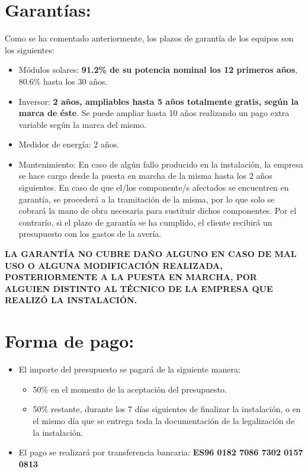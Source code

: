 \documentclass[fontsize=11pt, Myfinal=true, oneside, numbers=noenddot]{report}
\begin{document}
\section*{Garantías:}
Como se ha comentado anteriormente, los plazos de garantía de los equipos son los siguientes:
\begin{itemize}
\item Módulos solares: \textbf{91.2\% de su potencia nominal los 12 primeros años}, 80.6\% hasta los 30 años.
\item Inversor: \textbf{2 años, ampliables hasta 5 años totalmente gratis, según la marca de éste}. Se puede ampliar hasta 10 años realizando un pago extra variable según la marca del mismo.
\item Medidor de energía: 2 años.
\item Mantenimiento: En caso de algún fallo producido en la instalación, la empresa se hace cargo desde la puesta en marcha de la misma hasta los 2 años siguientes. En caso de que el/los componente/s afectados se encuentren en garantía, se procederá a la tramitación de la misma, por lo que solo se cobrará la mano de obra necesaria para sustituir dichos componentes. Por el contrarío, si el plazo de garantía se ha cumplido, el cliente recibirá un presupuesto con los gastos de la avería.           
\end{itemize}
\textbf{LA GARANTÍA NO CUBRE DAÑO ALGUNO EN CASO DE MAL USO O ALGUNA MODIFICACIÓN REALIZADA, POSTERIORMENTE A LA PUESTA EN MARCHA, POR ALGUIEN DISTINTO AL TÉCNICO DE LA EMPRESA QUE REALIZÓ LA INSTALACIÓN. }

\section*{Forma de pago:}
				 
\begin{itemize}
\item El importe del presupuesto se pagará de la siguiente manera:
\begin{itemize}
\item 50\% en el momento de la aceptación del presupuesto.
\item 50\% restante, durante los 7 días siguientes de finalizar la instalación, o en el mismo día que se entrega toda la documentación de la legalización de la instalación. 
\end{itemize}
\item El pago se realizará por transferencia bancaria: \textbf{ES96 0182 7086 7302 0157 0813}
\end{itemize}
\end{document}
